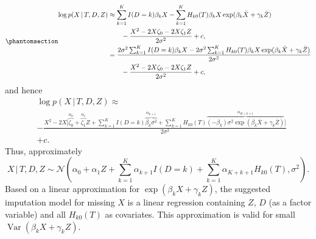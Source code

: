 \documentclass[
  letterpaper,
  DIV=11,
  numbers=noendperiod]{scrreprt}
\DeclareMathOperator{\Var}{Var}
\newcommand{\given}{\,|\,}
\begin{document}
\begin{equation}\phantomsection\label{eq-app-contin-lin}{
\begin{aligned}
    \log p(X \given T, D, Z) &\approx \sum^K_{k = 1} I(D=k) \beta_k X - \sum^K_{k = 1} H_{k0}(T) \beta_k X \exp(\beta_k \bar{X} + \gamma_k \bar{Z}) \\
    &\qquad - \frac{X^2 - 2X\zeta_0 - 2X\zeta_1 Z}{2\sigma^2} + c, \\
    &=  \frac{2\sigma^2\sum^K_{k = 1} I(D=k) \beta_k X - 2\sigma^2 \sum^K_{k = 1} H_{k0}(T) \beta_k X \exp(\beta_k \bar{X} + \gamma_k \bar{Z})}{2\sigma^2} \\
    &\qquad - \frac{X^2 - 2X\zeta_0 - 2X\zeta_1 Z}{2\sigma^2} + c,
\end{aligned}
}\end{equation} and hence \begin{align*}
    &\log p(X \given T, D, Z) \approx \\
    &- \frac{X^2 -2X\big[ \overbrace{\zeta_0}^{\alpha_0} + \overbrace{\zeta_1}^{\alpha_1} Z + \sum^K_{k = 1} I(D=k) \overbrace{\beta_k \sigma^2}^{\alpha_{k+1}} + \sum^K_{k = 1} H_{k0}(T) \overbrace{(-\beta_k) \sigma^2 \exp(\beta_k \bar{X} + \gamma_k \bar{Z})}^{\alpha_{K + k + 1}} \big]}{2\sigma^2} \\ &+ c.
\end{align*} Thus, approximately \begin{equation*}
    X \given T, D, Z \sim \mathcal{N}(\alpha_0 + \alpha_1 Z + \sum^K_{k = 1} \alpha_{k+1} I(D=k) + \sum^K_{k = 1} \alpha_{K + k + 1} H_{k0}(T),\sigma^2).
\end{equation*} Based on a linear approximation for
\(\exp(\beta_k X + \gamma_k Z)\), the suggested imputation model for
missing \(X\) is a linear regression containing \(Z\), \(D\) (as a
factor variable) and all \(H_{k0}(T)\) as covariates. This approximation
is valid for small \(\Var(\beta_k X + \gamma_k Z)\).
\end{document}
